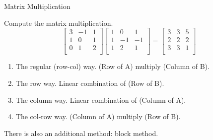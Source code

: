\documentclass{beamer}
\begin{document}
\begin{frame}{Matrix Multiplication}
\begin{examples}
Compute the matrix multiplication.
    \begin{equation*}
        \left[ \begin{matrix}
            3&		-1&       1\\
            1&		 0&       1\\
            0&		 1&       2\\
        \end{matrix} \right] \left[ \begin{matrix}
            1&		 0&       1\\
            1&		-1&      -1\\
            1&		 2&       1\\
        \end{matrix} \right] =\left[ \begin{matrix}
            3&		 3&       5\\
            2&		 2&       2\\
            3&		 3&       1\\
        \end{matrix} \right]
    \end{equation*}
\end{examples}

\begin{enumerate}
    \item The regular (row-col) way. (Row of A) multiply (Column of B).
    \item The row way. Linear combination of (Row of B).
    \item The column way. Linear combination of (Column of A).
    \item The col-row way. (Column of A) multiply (Row of B).
\end{enumerate}

There is also an additional method: block method.
\end{frame}
\end{document}
